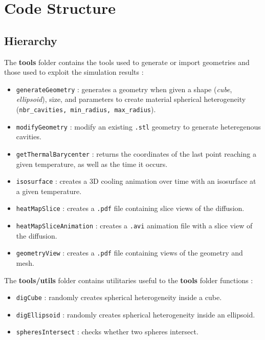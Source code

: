 \section{Code Structure}

\subsection{Hierarchy}

The \textbf{tools} folder contains the tools used to generate or import geometries and those used to exploit the simulation results :
\begin{itemize}
    \item \texttt{generateGeometry} : generates a geometry when given a shape (\textit{cube}, \textit{ellipsoid}), size, and parameters to create material spherical heterogeneity ({\tt nbr\_cavities, min\_radius, max\_radius}).
    \item \texttt{modifyGeometry} : modify an existing {\tt .stl} geometry to generate heteregenous cavities.
    \item \texttt{getThermalBarycenter} : returns the coordinates of the last point reaching a given temperature, as well as the time it occurs.
    \item \texttt{isosurface} : creates a 3D cooling animation over time with an isosurface at a given temperature. 
    \item \texttt{heatMapSlice} : creates a {\tt .pdf} file containing slice views of the diffusion. 
    \item \texttt{heatMapSliceAnimation} : creates a {\tt .avi} animation file with a slice view of the diffusion. 
    \item \texttt{geometryView} : creates a {\tt .pdf} file containing views of the geometry and mesh.
\end{itemize}

The \textbf{tools/utils} folder contains utilitaries useful to the \textbf{tools} folder functions : 
\begin{itemize}
    \item \texttt{digCube} : randomly creates spherical heterogeneity inside a cube.
    \item \texttt{digEllipsoid} : randomly creates spherical heterogeneity inside an ellipsoid.
    \item \texttt{spheresIntersect} : checks whether two spheres intersect.
\end{itemize}
\ 



